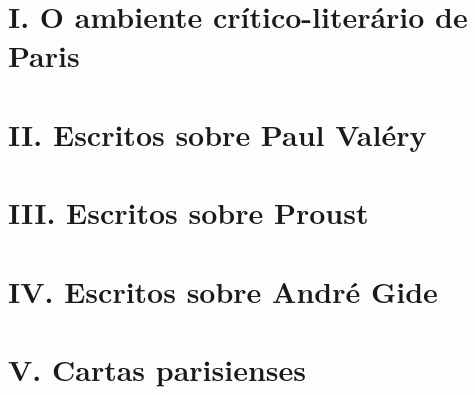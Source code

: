 

\part{I. O ambiente crítico-literário de Paris}




\part{II. Escritos sobre Paul Valéry}



\part{III. Escritos sobre Proust}


\part{IV. Escritos sobre André Gide}




\part{V. Cartas parisienses}


